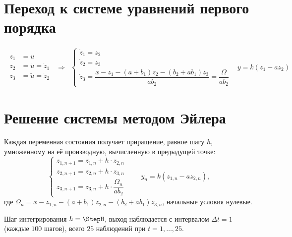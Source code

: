     \section{Переход к системе уравнений первого порядка}
        $$
            \begin{matrix}
                \begin{aligned}
                    z_1 &= u
                    \\
                    z_2 &= \dot{u} = \dot{z}_1
                    \\
                    z_3 &= \ddot{u} = \dot{z}_2
                \end{aligned}
                &
                \Rightarrow
                &
                \begin{cases}
                    \dot{z}_1 = z_2
                    \\
                    \dot{z}_2 = z_3
                    \\
                    \dot{z}_3 = \dfrac{x - z_1 - (a+b_1)z_2 - (b_2+ab_1)z_3}{ab_2} = \dfrac{\Omega}{ab_2}
                \end{cases}
                &
                y = k(z_1 - az_2)
            \end{matrix}
        $$

    \section{Решение системы методом Эйлера}
        Каждая переменная состояния получает приращение, равное шагу $h$, умноженному на её производную, вычисленную в предыдущей точке:
        $$
            \begin{cases}
                z_{1,n+1} = z_{1,n} + h \cdot z_{2,n}
                \\
                z_{2,n+1} = z_{2,n} + h \cdot z_{3,n}
                \\
                z_{3,n+1} = z_{3,n} + h \cdot \dfrac{\Omega_n}{ab_2}
            \end{cases}
            \qquad
            y_n = k(z_{1,n} - az_{2,n}),
        $$
        где $\Omega_n = x - z_{1,n} - (a+b_1)z_{2,n} - (b_2+ab_1)z_{3,n}$, начальные условия нулевые.

        Шаг интегрирования $h = \StepH$, выход наблюдается с интервалом $\Delta t = 1$ (каждые $100$ шагов), всего $25$ наблюдений при $t = 1, \ldots, 25$.

    \newpage
